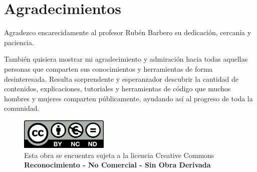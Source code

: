 \documentclass[12pt]{report} %
\begin{document}
				



			
			



\chapter*{Agradecimientos}

Agradezco encarecidamente al profesor Rubén Barbero su dedicación, cercanía y paciencia. 

También quisiera mostrar mi agradecimiento y admiración hacia todas aquellas personas que comparten sus conocimientos y herramientas de forma desinteresada. Resulta sorprendente y esperanzador descubrir la cantidad de contenidos, explicaciones, tutoriales y herramientas de código que muchos hombres y mujeres  comparten públicamente, ayudando así al progreso de toda la comunidad.

\begin{figure}[b!]
\centering
\captionsetup{justification=centering}
\includegraphics[width=4.2cm]{images/creativecommons.png}
\caption*{Esta obra se encuentra sujeta a la licencia Creative Commons \\
 \textbf{Reconocimiento - No Comercial - Sin Obra Derivada}}
\end{figure}

\setcounter{page}{4}
		
	\vfill
	
	\newpage %
	\thispagestyle{empty}
	\mbox{}
	


\tableofcontents
\thispagestyle{fancy}

\newpage %
\thispagestyle{empty}
\mbox{}

\listoffigures
\thispagestyle{fancy}

\newpage %
\thispagestyle{empty}
\mbox{}

\listoftables
\thispagestyle{fancy}

\newpage %
\thispagestyle{empty}
\mbox{}
\end{document}
